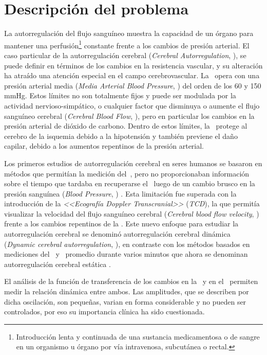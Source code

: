 \section{Descripción del problema}
La autorregulación del flujo sanguíneo muestra la capacidad de un órgano para mantener una perfusión\footnote{Introducción lenta y continuada de una sustancia medicamentosa o de sangre en un organismo u órgano por vía intravenosa, subcutánea o rectal.} constante frente a los cambios de presión arterial. El caso particular de la autorregulación cerebral ({\em Cerebral Autorregulation}, \ca), se puede definir en términos de los cambios en la resistencia vascular, y su alteración ha atraído una atención especial en el campo cerebrovascular. La \ca\, opera con una presión arterial media ({\em Media Arterial Blood Pressure}, \pam) del orden de los 60 y 150 mmHg. Estos límites no son totalmente fijos y puede ser modulada por la actividad nervioso-simpático, o cualquier factor que disminuya o aumente el flujo sanguíneo cerebral ({\em Cerebral Blood Flow}, \cbf), pero en particular los cambios en la presión arterial de dióxido de carbono. Dentro de estos límites, la \ca\, protege al cerebro de la isquemia debido a la hipotensión y también previene el daño capilar, debido a los aumentos repentinos de la presión arterial.

Los primeros estudios de autorregulación cerebral en seres humanos se basaron en métodos que permitían la medición del \cbf\,, pero no proporcionaban información sobre el tiempo que tardaba en recuperarse el \cbf\, luego de un cambio brusco en la presión sanguínea ({\em Blood Pressure}, \bp) \citep{Lassen1959}. Esta limitación fue superada con la introducción de la {\em <<Ecografía Doppler Transcranial>>} ({\em TCD}), la que permitía visualizar la velocidad del flujo sanguíneo cerebral ({\em Cerebral blood flow velocity}, \cbfv) frente a los cambios repentinos de la \pam. Este nuevo enfoque para estudiar la autorregulación cerebral se denominó autorregulación cerebral dinámica ({\em Dynamic cerebral autorregulation}, \dca), en contraste con los métodos basados en mediciones del \cbf\, y \bp\, promedio durante varios minutos que ahora se denominan autorregulación cerebral estática \citep{Aaslid1989, Panerai1998a, Tiecks1995a}.

El análisis de la función de transferencia de los cambios en la \bp\ y en el \cbf\, permiten medir la relación dinámica entre ambos. Las amplitudes, que se describen por dicha oscilación, son pequeñas, varian en forma considerable y no pueden ser controlados, por eso su importancia clínica ha sido cuestionada.

